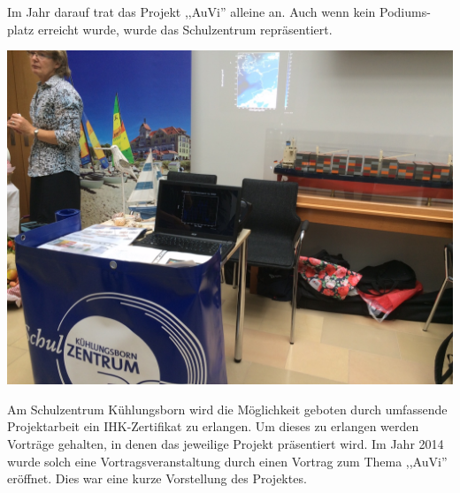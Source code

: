 Im Jahr darauf trat das Projekt ,,AuVi'' alleine an. Auch wenn kein Podiums-platz
erreicht wurde, wurde das Schulzentrum repräsentiert.
\begin{center}
	\includegraphics[width=\linewidth]{imgs/oea/ihks.jpg}
\end{center}
Am Schulzentrum Kühlungsborn wird die Möglichkeit geboten durch
umfassende Projektarbeit ein IHK-Zertifikat zu erlangen.
Um dieses zu erlangen werden Vorträge gehalten, in denen das jeweilige Projekt präsentiert wird.
Im Jahr 2014 wurde solch eine Vortragsveranstaltung durch einen Vortrag zum Thema ,,AuVi'' eröffnet.
Dies war eine kurze Vorstellung des Projektes.
